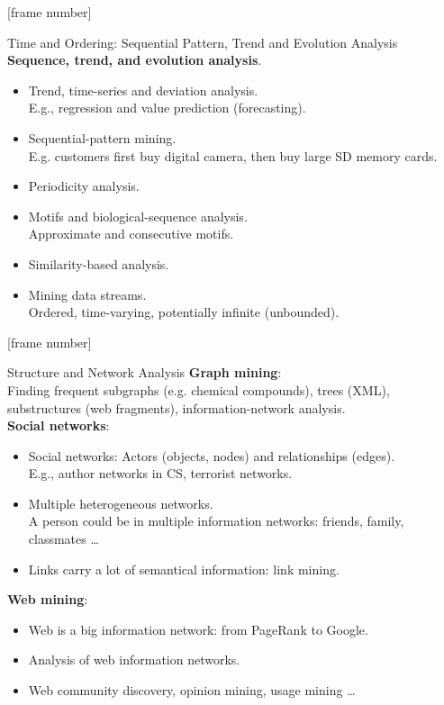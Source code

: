 \documentclass[aspectratio=169,t]{beamer}
\begin{document}
  {
    [frame number]
    \begin{frame}{Time and Ordering: Sequential Pattern, Trend and Evolution Analysis}
    \textbf{Sequence, trend, and evolution analysis}.\\
    \begin{itemize}
        \item Trend, time-series and deviation analysis. \\
              E.g., regression and value prediction (forecasting).
        \item Sequential-pattern mining.\\
              E.g. customers first buy digital camera, then buy large SD memory cards.
        \item Periodicity analysis.
        \item Motifs and biological-sequence analysis.\\
              Approximate and consecutive motifs.
        \item Similarity-based analysis.\\
        \item Mining data streams.\\
              Ordered, time-varying, potentially infinite (unbounded).
    \end{itemize}
    \end{frame}
  }

  {
    [frame number]
    \begin{frame}{Structure and Network Analysis}
    \textbf{Graph mining}:\\
    Finding frequent subgraphs (e.g. chemical compounds), trees (XML), substructures (web fragments), information-network analysis.\\[0.2cm]

    \textbf{Social networks}:
    \begin{itemize}
        \item Social networks: Actors (objects, nodes) and relationships (edges).\\
              E.g., author networks in CS, terrorist networks.
        \item Multiple heterogeneous networks.\\
              A person could be in multiple information networks: friends, family, classmates \ldots
        \item Links carry a lot of semantical information: link mining.
    \end{itemize}

    \textbf{Web mining}:
    \begin{itemize}
        \item Web is a big information network: from PageRank to Google.
        \item Analysis of web information networks.
        \item Web community discovery, opinion mining, usage mining \ldots
    \end{itemize}
    \end{frame}
  }
\end{document}
